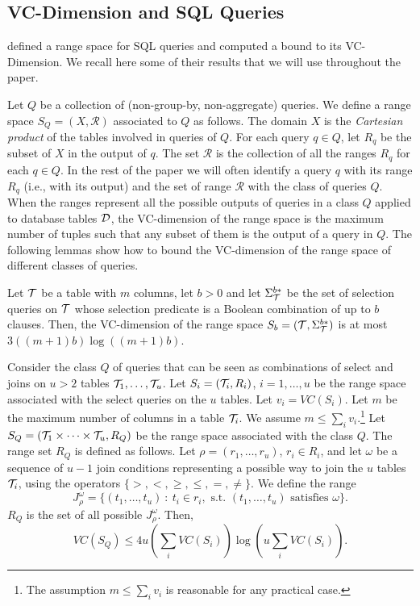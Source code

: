 \subsection{VC-Dimension and SQL Queries}\label{sec:vcdimquer}
\citet{RiondatoACZU11} defined a range space for SQL queries and computed a
bound to its VC-Dimension. We recall here some of their results that we will use
throughout the paper.

Let $Q$ be a collection of (non-group-by, non-aggregate) queries. We define a
range space $S_Q=(X,\mathcal{R})$ associated to $Q$ as follows. The domain $X$
is the \emph{Cartesian product} of the tables involved in queries of $Q$. For
each query $q\in Q$, let $R_q$ be the subset of $X$ in the output of $q$. The
set $\mathcal{R}$ is the collection of all the ranges $R_q$ for each $q\in Q$.
In the rest of the paper we will often identify a query $q$ with its range $R_q$
(i.e., with its output) and the set of range $\mathcal{R}$ with the class of
queries $Q$. When the ranges represent all the possible outputs of queries in a class $Q$
applied to database tables ${\cal D}$, the VC-dimension of the range space is the maximum
number of tuples such that any subset of them is the output of a query in $Q$.
The following lemmas show how to bound the VC-dimension of the
range space of different classes of queries.

\begin{lemma}\label{lem:vcdimselgen}
  Let ${\cal T}$ be a table with $m$ columns, let $b>0$ and let $\Sigma^{b*}_{\cal T}$
  be the set of selection queries on ${\cal T}$ whose selection predicate is a
  Boolean combination of up to $b$ clauses. Then, the VC-dimension of the range
  space $S_b = ({\cal T}, \Sigma^{b*}_{\cal T})$ is at most $3((m+1)b)\log((m+1)b)$.  
\end{lemma}

\begin{lemma}\label{lem:vcdimjoinmul}
  Consider the class $Q$ of queries that can be seen as combinations of select
  and joins on $u>2$ tables ${\cal T}_1,\dotsc,{\cal T}_u$. Let $S_i=({\cal T}_i,R_i)$,
  $i=1,\dotsc,u$ be the range space associated with the select queries on the $u$
  tables. Let $v_i=VC(S_i)$. Let $m$ be the maximum number of columns in a table
  ${\cal T}_i$. We assume $m\le \sum_i v_i$.\footnote{The assumption $m\le \sum_i
  v_i$ is reasonable for any practical case.} Let $S_Q = ({\cal T}_1\times\dotsb\times
  {\cal T}_u, R_Q)$ be the range space associated with the class $Q$. The range set
  $R_Q$ is defined as follows. Let $\rho = (r_1,\dotsc,r_u)$, $r_i\in R_i$, and
  let $\omega$ be a sequence of
  $u-1$ join conditions representing a possible way to join the $u$ tables ${\cal T}_i$,
  using the operators $\{>,<,\ge,\le,=,\neq\}$. We define the range 
  \[
  J^\omega_{\rho} = \{(t_1,\dotsc,t_u) ~:~ t_i\in r_i, \text{ s.t. }
  (t_1,\dotsc,t_u) \text{ satisfies } \omega\}.\]
  $R_Q$ is the set of all possible $J^\omega_{\rho}$. Then,
  \[
  VC(S_Q)\leq 4u(\sum_i VC(S_i))\log(u\sum_i VC(S_i)).
  \]
\end{lemma}

